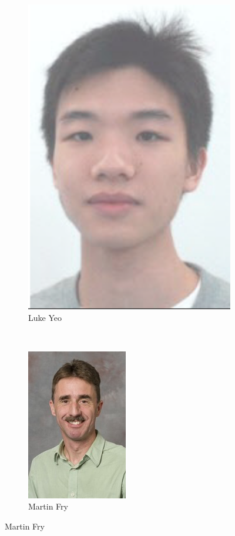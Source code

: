 \begin{figure}
\begin{subfigure}[b]{0.45\textwidth}
        \includegraphics[height=0.3\textheight]{Files/LY}
        \caption{Luke Yeo}
    \end{subfigure}\\
    \vspace{0.5cm}
    \begin{subfigure}[b]{\textwidth}
        \centering
        \includegraphics[height=0.3\textheight]{Files/MF}
        \caption{Martin Fry}
    \end{subfigure}
\end{figure}
